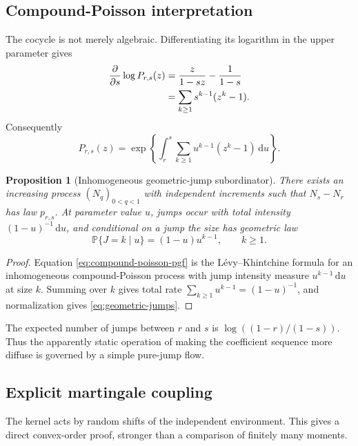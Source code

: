 \documentclass[11pt,a4paper]{article}
\newtheorem{proposition}[theorem]{Proposition}
\theoremstyle{definition}
\newcommand{\Pp}{\mathbb{P}}
\newcommand{\dd}{\,\mathrm{d}}
\newcommand{\1}{\mathbf{1}}
\begin{document}
\subsection{Compound-Poisson interpretation}

The cocycle is not merely algebraic.  Differentiating its logarithm in the
upper parameter gives
\begin{align}
 \frac{\partial}{\partial s}\log P_{r,s}(z)
 &=\frac{z}{1-sz}-\frac{1}{1-s}
 \notag\\
 &=\sum_{k\ge1}s^{k-1}(z^k-1).
 \label{eq:levy-generator}
\end{align}
Consequently
\begin{equation}
 P_{r,s}(z)=
 \exp\left\{\int_r^s\sum_{k\ge1}u^{k-1}(z^k-1)\dd u\right\}.
 \label{eq:compound-poisson-pgf}
\end{equation}

\begin{proposition}[Inhomogeneous geometric-jump subordinator]
\label{prop:subordinator}
There exists an increasing process $(N_q)_{0<q<1}$ with independent
increments such that $N_s-N_r$ has law $p_{r,s}$.  At parameter value $u$,
jumps occur with total intensity $(1-u)^{-1}\dd u$, and conditional on a
jump the size has geometric law
\begin{equation}
 \Pp\{J=k\mid u\}=(1-u)u^{k-1},\qquad k\ge1.
 \label{eq:geometric-jumps}
\end{equation}
\end{proposition}

\begin{proof}
Equation \eqref{eq:compound-poisson-pgf} is the L\'evy--Khintchine formula
for an inhomogeneous compound-Poisson process with jump intensity measure
$u^{k-1}\dd u$ at size $k$.  Summing over $k$ gives total rate
$\sum_{k\ge1}u^{k-1}=(1-u)^{-1}$, and normalization gives
\eqref{eq:geometric-jumps}.
\end{proof}

The expected number of jumps between $r$ and $s$ is
$\log((1-r)/(1-s))$.  Thus the apparently static operation of making the
coefficient sequence more diffuse is governed by a simple pure-jump flow.

\subsection{Explicit martingale coupling}

The kernel acts by random shifts of the independent environment.  This gives
a direct convex-order proof, stronger than a comparison of finitely many
moments.
\end{document}

